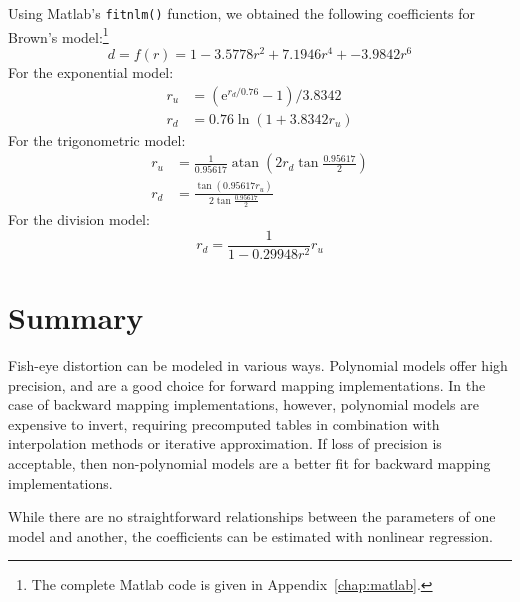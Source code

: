 \documentclass[english,12pt]{ifimaster}
\DeclareMathOperator{\atan}{atan}
\begin{document}
Using Matlab's \lstinline|fitnlm()| function, we obtained the
following coefficients for Brown's model:\footnote{The complete Matlab
  code is given in Appendix~\ref{chap:matlab}.}
\begin{equation}
  \label{eq:taylorparam}
  d = f(r) = 1 - 3.5778r^2 + 7.1946r^4 + -3.9842r^6
\end{equation}
For the exponential model:
\begin{align}
  \label{eq:expparam}
  r_u &= (\mathrm{e}^{r_d/0.76} - 1) / 3.8342\\
  \label{eq:logparam}
  r_d &= 0.76\ln(1 + 3.8342r_u)
\end{align}
For the trigonometric model:
\begin{align}
  \label{eq:devernayparam}
  r_u &= \tfrac{1}{0.95617} \atan(2r_d\tan{\tfrac{0.95617}{2}})\\
  r_d &= \frac{\tan(0.95617r_u)}{2\tan{\tfrac{0.95617}{2}}}
\end{align}
For the division model:
\begin{equation}
  \label{eq:divisionparam}
  r_d = \frac{1}{1 - 0.29948r^2}r_u
\end{equation}

\section*{Summary}

Fish-eye distortion can be modeled in various ways. Polynomial models
offer high precision, and are a good choice for forward mapping
implementations. In the case of backward mapping implementations,
however, polynomial models are expensive to invert, requiring
precomputed tables in combination with interpolation methods or
iterative approximation. If loss of precision is acceptable, then
non-polynomial models are a better fit for backward mapping
implementations.

While there are no straightforward relationships between the
parameters of one model and another, the coefficients can be estimated
with nonlinear regression.



\end{document}
